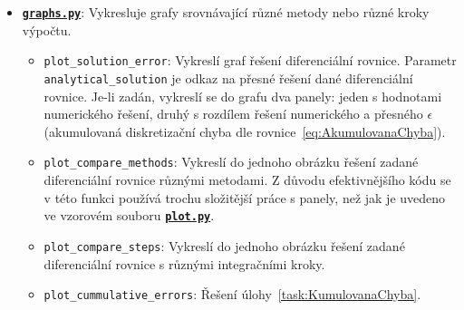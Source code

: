 \documentclass[a4paper,11pt,twoside]{article}
\def\code#1{\textnormal{\texttt{#1}}}
\def\ghfile#1#2{\textnormal{\textbf{\texttt{\href{https://github.com/PavelStransky/PCInPhysics/blob/main/#1#2}{#2}}}}}
\theoremstyle{red}
\theoremstyle{green}
\begin{document}
\begin{solution}
\begin{itemize}
    \begin{figure}[!htbp]
        \begin{subfigure}{0.49\linewidth}
            \centering{}
        \end{subfigure}
        \hfill
        \begin{subfigure}{0.49\linewidth}
            \centering{}
        \end{subfigure}
        \begin{subfigure}{0.49\linewidth}
            \centering{}
        \end{subfigure}
        \hfill
        \begin{subfigure}{0.49\linewidth}
            \centering{}
        \end{subfigure}
        \caption{
            \protect\small
            Integrace relaxační diferenciální rovnice~\eqref{eq:relaxace} různými metodami a s různými časovými kroky.
        }	
        \label{fig:relaxace}
    \end{figure}    

    \item \ghfile{python/ode/}{graphs.py}: 
        Vykresluje grafy srovnávající různé metody nebo různé kroky výpočtu.
        \begin{itemize}
        \item \code{plot_solution_error}:
            Vykreslí graf řešení diferenciální rovnice.
            Parametr \code{analyti\-cal_solution} je odkaz na přesné řešení dané diferenciální rovnice. 
            Je-li zadán, vykreslí se do grafu dva panely: jeden s hodnotami numerického řešení, druhý s rozdílem řešení numerického a přesného $\epsilon$ (akumulovaná diskretizační chyba dle  rovnice~\eqref{eq:AkumulovanaChyba}).
        \item \code{plot_compare_methods}:
            Vykreslí do jednoho obrázku řešení zadané diferenciální rovnice různými metodami.
            Z důvodu efektivnějšího kódu se v této funkci používá trochu složitější práce s panely, než jak je uvedeno ve vzorovém souboru \ghfile{python/basics/}{plot.py}.
        \item \code{plot_compare_steps}:
            Vykreslí do jednoho obrázku řešení zadané diferenciální rovnice s různými integračními kroky.
        \item \code{plot_cummulative_errors}:
            Řešení úlohy~\ref{task:KumulovanaChyba}.
        \end{itemize}


\end{itemize}
\end{solution}
\end{document}
